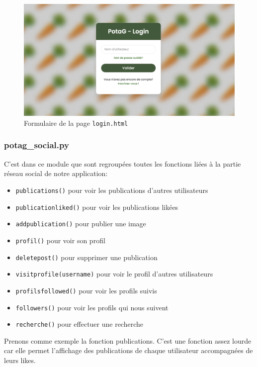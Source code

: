 \documentclass[11pt]{article}
\begin{document}
\begin{figure}[h]
    \centering
    \includegraphics[scale=0.4]{ScreenLogin.png}
    \caption{Formulaire de la page \texttt{login.html}}
\end{figure}

\subsubsection{potag\_social.py}

C'est dans ce module que sont regroupées toutes les fonctions liées à la partie réseau social de notre application:

\begin{itemize} 
\item \texttt{publications()} pour voir les publications d'autres utilisateurs
\item \texttt{publicationliked()} pour voir les publications likées
\item \texttt{addpublication()} pour publier une image
\item \texttt{profil()} pour voir son profil
\item \texttt{deletepost()} pour supprimer une publication
\item \texttt{visitprofile(username)} pour voir le profil d'autres utilisateurs
\item \texttt{profilsfollowed()} pour voir les profils suivis
\item \texttt{followers()} pour voir les profils qui nous suivent
\item \texttt{recherche()} pour effectuer une recherche
\end{itemize} 
\vspace{0.4cm}

Prenons comme exemple la fonction publications. C'est une fonction assez lourde car elle permet l'affichage des publications de chaque utilisateur accompagnées de leurs likes.
\end{document}

